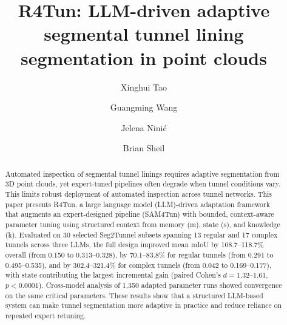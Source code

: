 \documentclass[a4paper,fleqn]{cas-dc}
\begin{document}
\let\WriteBookmarks\relax
\def\floatpagepagefraction{1}
\def\textpagefraction{.001}



\title[mode=title]{R4Tun: LLM-driven adaptive segmental tunnel lining segmentation in point clouds}

\author[1]{Xinghui Tao}

\author[1]{Guangming Wang}
\cormark[1]

\author[2]{Jelena Nini\'{c}}

\author[1]{Brian Sheil}





\begin{abstract}
Automated inspection of segmental tunnel linings requires adaptive segmentation from 3D point clouds, yet expert-tuned pipelines often degrade when tunnel conditions vary. This limits robust deployment of automated inspection across tunnel networks. This paper presents R4Tun, a large language model (LLM)-driven adaptation framework that augments an expert-designed pipeline (SAM4Tun) with bounded, context-aware parameter tuning using structured context from memory (m), state (s), and knowledge (k). Evaluated on 30 selected Seg2Tunnel subsets spanning 13 regular and 17 complex tunnels across three LLMs, the full design improved mean mIoU by 108.7--118.7\% overall (from 0.150 to 0.313--0.328), by 70.1--83.8\% for regular tunnels (from 0.291 to 0.495--0.535), and by 302.4--321.4\% for complex tunnels (from 0.042 to 0.169--0.177), with state contributing the largest incremental gain (paired Cohen's $d = 1.32$--$1.61$, $p < 0.0001$). Cross-model analysis of 1,350 adapted parameter runs showed convergence on the same critical parameters. These results show that a structured LLM-based system can make tunnel segmentation more adaptive in practice and reduce reliance on repeated expert retuning.
\end{abstract}
\end{document}
